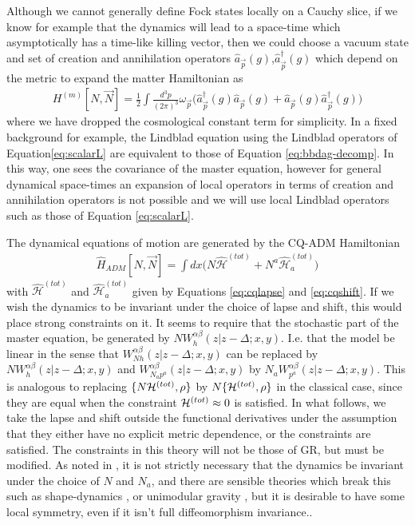 \documentclass[aps,pra,showpacs,citeautoscript,amsmath,amssymb,floatfix,superscriptaddress,bbm, verbatim,amsfonts,changes,11pt,nofootinbib,longbibliography]{revtex4-2}
\def\z{{z}}
\def\Hq{\hat{H}}
\def\dist{{\Delta}}
\def\superhamtot{{\cal H}^{(tot)}}
\def\qsuperhamtot{\hat{\mathcal{H}}^{(tot)}}
\def\qsupermomtot{\qsuperhamtot}%
\def\matterham{H^{(m)}}
\def\lapsh{[N,\vec{N}]}
\newcommand{\ann}[1]{{\hat{a}}_{\vec{#1}}}
\newcommand{\adag}[1]{{\hat{a}}^\dagger_{\vec{#1}}}
\def\cqadm{{\Hq_{ADM}}}
\def\rate{{W}}
\def\ab{^{\alpha\beta}}
\begin{document}
Although we cannot generally define Fock states locally on a Cauchy slice, if we know for example that the dynamics will lead to a space-time which asymptotically has a time-like killing vector, then we could choose a vacuum state and
	\label{par:fock} 
set of creation and annihilation operators $\ann{p}(g)$,$\adag{p}(g)$ which depend on the metric to expand the matter Hamiltonian as
\begin{align}
\matterham\lapsh
= \frac{1}{2}\int \frac{d^3p}{(2\pi)^3}\omega_{\vec{p}}\Big( \adag{p}(g)\ann{p}(g)+\ann{p}(g)\adag{p}(g)\Big)
\label{eq:bbdag-decomp}
\end{align}
where %
we have dropped the 
cosmological constant term for simplicity. In a fixed background for example, the Lindblad equation using the Lindblad operators of Equation\eqref{eq:scalarL} are equivalent to those of Equation \eqref{eq:bbdag-decomp}. In this way, one sees the covariance of the master equation, however for general dynamical space-times an expansion of local operators in terms of creation and annihilation operators is not possible and we will use local Lindblad operators such as those
 of Equation \eqref{eq:scalarL}. %



The dynamical equations of motion are generated by the CQ-ADM Hamiltonian
\begin{align}
\cqadm[N,\vec{N}]=\int dx \big(N\qsuperhamtot+N^a\qsupermomtot_a\big)
\label{eq:CQADM}
\end{align}
with $\qsuperhamtot$ and $\qsupermomtot_a$ given by Equations \eqref{eq:cqlapse} and \eqref{eq:cqshift}. If we wish the dynamics to be invariant under the choice of lapse and shift, this would place strong constraints on it. 
It seems to
require that the stochastic part of the master equation, be generated by $N\rate_h\ab(\z|\z-\dist;x,y)$. I.e. that the model be linear in the sense that
$\rate\ab_{Nh}(\z|\z-\dist;x,y)$
can be replaced by
$N\rate\ab_{h}(\z|\z-\dist;x,y)$
and
$\rate\ab_{N_ap^a}(\z|\z-\dist;x,y)$
by $N_a\rate\ab_{p^a}(\z|\z-\dist;x,y)$. This is analogous to replacing $\{N\superhamtot,\rho\}$ by $N\{\superhamtot,\rho\}$ in the classical case, since they are equal when the constraint $\superhamtot\approx 0$ is satisfied.
	 In what follows, we take the lapse and shift outside the functional derivatives under the assumption that they
	either have no explicit metric dependence, or the constraints 
	are satisfied. The constraints in this theory will not be those of GR, but must be modified. As noted in  \cite{UCL2022constraints}, it is not strictly necessary that the dynamics be invariant under the choice of $N$ and $N_a$, and there are sensible theories which break this such as shape-dynamics \cite{mercati2017shape, Anderson_2005, Gomes_2012}, or unimodular gravity \cite{einstein1952gravitational,van1982exchange,weinberg1989cosmological,unruh1989unimodular,alvarez2005can,smolin2009quantization, shaposhnikov2009scale}, but it is desirable to have some local symmetry, even if it isn't full diffeomorphism invariance.\label{ft:lapse_linear}.
	
\end{document}
